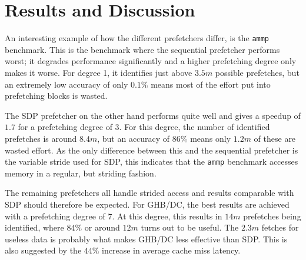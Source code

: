 \section{Results and Discussion}
\label{sec:results-and-discussion}


An interesting example of how the different prefetchers differ, is the \texttt{ammp} benchmark.
This is the benchmark where the sequential prefetcher performs worst;
it degrades performance significantly and a higher prefetching degree only makes
it worse.
For degree 1, it identifies just above $3.5m$ possible prefetches, but an
extremely low accuracy of only $0.1\%$ means most of the effort put into
prefetching blocks is wasted.

The SDP prefetcher on the other hand performs quite well and gives a speedup of
$1.7$ for a prefetching degree of $3$.
For this degree, the number of identified prefetches is around $8.4m$, but an
accuracy of $86\%$ means only $1.2m$ of these are wasted effort.
As the only difference between this and the sequential prefetcher is the
variable stride used for SDP, this indicates that the \texttt{ammp} benchmark
accesses memory in a regular, but striding fashion.

The remaining prefetchers all handle strided access and results comparable with
SDP should therefore be expected.
For GHB/DC, the best results are achieved with a prefetching degree of $7$.
At this degree, this results in $14m$ prefetches being identified, where $84\%$
or around $12m$ turns out to be useful.
The $2.3m$ fetches for useless data is probably what makes GHB/DC less effective
than SDP.
This is also suggested by the $44\%$ increase in average cache miss latency.

